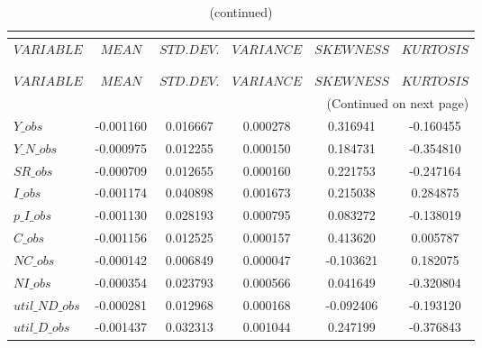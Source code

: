  
\begin{center}
\begin{longtable}{lccccc} 
\caption{MOMENTS OF SIMULATED VARIABLES}\\
 \label{Table:sim_moments}\\
\toprule 
$VARIABLE       $	 & 	 $            MEAN$	 & 	 $       STD. DEV.$	 & 	 $        VARIANCE$	 & 	 $        SKEWNESS$	 & 	 $        KURTOSIS$\\
\midrule \endfirsthead 
\caption{(continued)}\\
 \toprule \\ 
$VARIABLE       $	 & 	 $            MEAN$	 & 	 $       STD. DEV.$	 & 	 $        VARIANCE$	 & 	 $        SKEWNESS$	 & 	 $        KURTOSIS$\\
\midrule \endhead 
\midrule \multicolumn{6}{r}{(Continued on next page)} \\ \bottomrule \endfoot 
\bottomrule \endlastfoot 
$Y\_obs         $	 & 	       -0.001160	 & 	        0.016667	 & 	        0.000278	 & 	        0.316941	 & 	       -0.160455 \\ 
$Y\_N\_obs      $	 & 	       -0.000975	 & 	        0.012255	 & 	        0.000150	 & 	        0.184731	 & 	       -0.354810 \\ 
$SR\_obs        $	 & 	       -0.000709	 & 	        0.012655	 & 	        0.000160	 & 	        0.221753	 & 	       -0.247164 \\ 
$I\_obs         $	 & 	       -0.001174	 & 	        0.040898	 & 	        0.001673	 & 	        0.215038	 & 	        0.284875 \\ 
$p\_I\_obs      $	 & 	       -0.001130	 & 	        0.028193	 & 	        0.000795	 & 	        0.083272	 & 	       -0.138019 \\ 
$C\_obs         $	 & 	       -0.001156	 & 	        0.012525	 & 	        0.000157	 & 	        0.413620	 & 	        0.005787 \\ 
$NC\_obs        $	 & 	       -0.000142	 & 	        0.006849	 & 	        0.000047	 & 	       -0.103621	 & 	        0.182075 \\ 
$NI\_obs        $	 & 	       -0.000354	 & 	        0.023793	 & 	        0.000566	 & 	        0.041649	 & 	       -0.320804 \\ 
$util\_ND\_obs  $	 & 	       -0.000281	 & 	        0.012968	 & 	        0.000168	 & 	       -0.092406	 & 	       -0.193120 \\ 
$util\_D\_obs   $	 & 	       -0.001437	 & 	        0.032313	 & 	        0.001044	 & 	        0.247199	 & 	       -0.376843 \\ 

\end{longtable}
\end{center}
